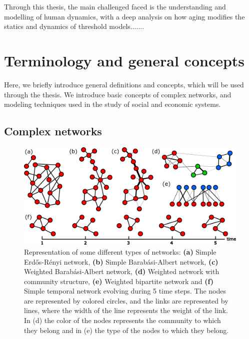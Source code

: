 Through this thesis, the main challenged faced is the understanding and modelling of human dynamics, with a deep analysis on how aging modifies the statics and dynamics of threshold models.......

\section{\label{sec:Terminology and general concepts} Terminology and general concepts}

Here, we briefly introduce general definitions and concepts, which will be used through the thesis. We introduce basic concepts of complex networks, and modeling techniques used in the study of social and economic systems.
\subsection{\label{subsec:Complex networks} Complex networks}

\begin{figure}
    \centering
    \includegraphics[width=\textwidth]{Figs/Introduction/network_plot.pdf}
    \caption[Different network types]{Representation of some different types of networks: \textbf{(a)} Simple Erd\H{o}s-R\'enyi network, \textbf{(b)} Simple Barab\'asi-Albert network, \textbf{(c)} Weighted Barab\'asi-Albert network, \textbf{(d)} Weighted network with community structure, \textbf{(e)} Weighted bipartite network and \textbf{(f)} Simple temporal network evolving during 5 time steps. The nodes are represented by colored circles, and the links are represented by lines, where the width of the line represents the weight of the link. In (d) the color of the nodes represents the community to which they belong and in (e) the type of the nodes to which they belong.}
    \label{fig:netwotk_types}
\end{figure}

